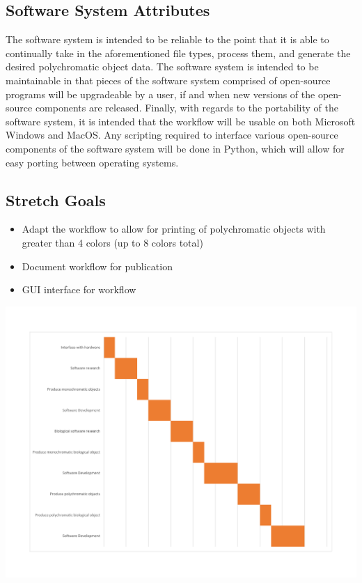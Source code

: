 \documentclass[letterpaper, onecolumn, draftclsnofoot, 10pt, compsoc]{IEEEtran}
\begin{document}
    \subsection{Software System Attributes}
    The software system is intended to be reliable to the point that it is able to continually take in the aforementioned file types, process them, and generate the desired polychromatic object data. 
    The software system is intended to be maintainable in that pieces of the software system comprised of open-source programs will be upgradeable by a user, if and when new versions of the open-source components are released. 
    Finally, with regards to the portability of the software system, it is intended that the workflow will be usable on both Microsoft Windows and MacOS. 
    Any scripting required to interface various open-source components of the software system will be done in Python, which will allow for easy porting between operating systems. 
    
    \subsection{Stretch Goals}
    \begin{itemize}
    	\item Adapt the workflow to allow for printing of polychromatic objects with greater than 4 colors (up to 8 colors total)
        \item Document workflow for publication
        \item GUI interface for workflow
    \end{itemize}

\newpage
{}
  \begin{center}
  \includegraphics[width=7in]{gantt}
  \end{center}
\end{document}
